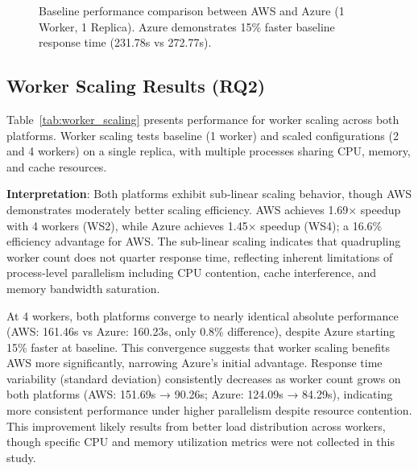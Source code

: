 \begin{figure}[!htbp]
\centering
{}
\caption{Baseline performance comparison between AWS and Azure (1 Worker, 1 Replica). Azure demonstrates 15\% faster baseline response time (231.78s vs 272.77s).}
\label{fig:baseline}
\end{figure}

\subsection{Worker Scaling Results (RQ2)}

Table~\ref{tab:worker_scaling} presents performance for worker scaling across both platforms. Worker scaling tests baseline (1 worker) and scaled configurations (2 and 4 workers) on a single replica, with multiple processes sharing CPU, memory, and cache resources.

\textbf{Interpretation}: Both platforms exhibit sub-linear scaling behavior, though AWS demonstrates moderately better scaling efficiency. AWS achieves 1.69× speedup with 4 workers (WS2), while Azure achieves 1.45× speedup (WS4); a 16.6\% efficiency advantage for AWS. The sub-linear scaling indicates that quadrupling worker count does not quarter response time, reflecting inherent limitations of process-level parallelism including CPU contention, cache interference, and memory bandwidth saturation.

At 4 workers, both platforms converge to nearly identical absolute performance (AWS: 161.46s vs Azure: 160.23s, only 0.8\% difference), despite Azure starting 15\% faster at baseline. This convergence suggests that worker scaling benefits AWS more significantly, narrowing Azure's initial advantage. Response time variability (standard deviation) consistently decreases as worker count grows on both platforms (AWS: 151.69s → 90.26s; Azure: 124.09s → 84.29s), indicating more consistent performance under higher parallelism despite resource contention. This improvement likely results from better load distribution across workers, though specific CPU and memory utilization metrics were not collected in this study.



